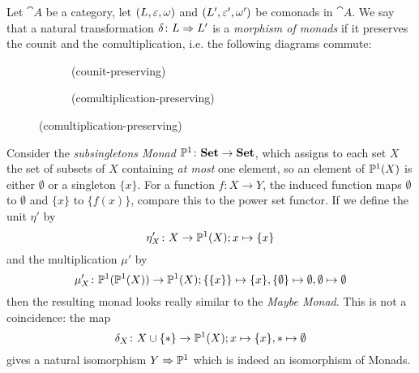 \begin{definition}
    Let $\cat{A}$ be a category, let $(L,\eps,\omega)$ and $(L',\eps',\omega')$ be comonads in $\cat{A}$.
    We say that a natural transformation $\nat[\delta]{L}{L'}$ is a \textit{morphism of monads} if it preserves
    the counit and the comultiplication, i.e. the following diagrams commute:
    \begin{figure}[H]
    \centering
    \begin{subfigure}{0.4\textwidth}
    \centering
    \caption*{(counit-preserving)}
    \end{subfigure}
    \hspace{2em}
    \begin{subfigure}{0.4\textwidth}
    \centering
    \caption*{(comultiplication-preserving)}
    \end{subfigure}
    \end{figure} 
\end{definition}
\begin{example}
    Consider the \textit{subsingletons Monad} $\P^1 \colon \cat{Set} \to \cat{Set}$, which
    assigns to each set $X$ the set of subsets of $X$ containing \textit{at most} one element, so
    an element of $\P^1(X)$ is either $\emptyset$ or a singleton $\{x\}$. For a function 
    $f \colon X \to Y$, the induced function maps $\emptyset$ to $\emptyset$ and $\{x\}$ to 
    $\{f(x)\}$, compare this to the power set functor. If we define the unit $\eta'$ by
    \[
        \eta'_X \colon X \to \P^1(X); x \mapsto \{x\}
    \]
    and the multiplication $\mu'$ by 
    \[
        \mu'_X \colon \P^1(\P^1(X)) \to \P^1(X); \{\{x\}\} \mapsto \{x\},
        \{\emptyset\} \mapsto \emptyset, \emptyset \mapsto \emptyset
    \]
    then the resulting monad looks really similar to the \textit{Maybe Monad}. 
    This is not a coincidence: the map
    \[
        \delta_X \colon X \cup \pt \to \P^1(X); x \mapsto \{x\}, \ast \mapsto \emptyset
    \]
    gives a natural isomorphism $Y \Rightarrow \P^1$ which is indeed an isomorphism of Monads.


\end{example}

